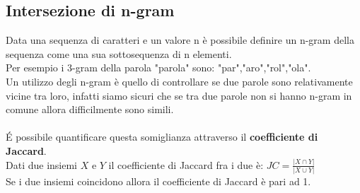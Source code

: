 \documentclass[]{article}
\begin{document}
\subsection{Intersezione di n-gram}
Data una sequenza di caratteri e un valore n è possibile definire un n-gram della sequenza come una sua sottosequenza di n elementi.\\
Per esempio i 3-gram della parola "parola" sono: "par","aro","rol","ola".\\
Un utilizzo degli n-gram è quello di controllare se due parole sono relativamente vicine tra loro, infatti siamo sicuri che se tra due parole non si hanno n-gram in comune allora difficilmente sono simili.\\\\
\'E possibile quantificare questa somiglianza attraverso il \textbf{coefficiente di Jaccard}.\\
Dati due insiemi $X$ e $Y$ il coefficiente di Jaccard fra i due è: $JC=\frac{\lvert X\cap Y \rvert}{\lvert X\cup Y \rvert}$\\
Se i due insiemi coincidono allora il coefficiente di Jaccard è pari ad 1.
\end{document}
